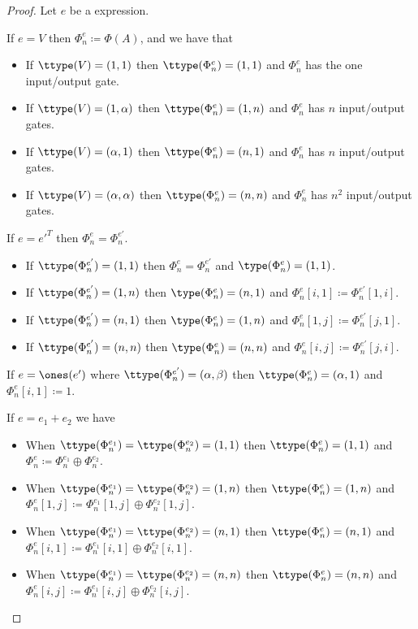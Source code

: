 \begin{proof}

Let $e$ be a \langfor expression. 

If $e=V$ then $\Phi_n^e\coloneqq \Phi(A)$, and we have that
\begin{itemize}
	\item If $\ttype(V)=(1,1)$ then $\ttype(\Phi^e_n)=(1,1)$ and $\Phi^e_n$ has the one input/output gate.
	\item If $\ttype(V)=(1,\alpha)$ then $\ttype(\Phi^e_n)=(1,n)$ and $\Phi^e_n$ has $n$ input/output gates.
  \item If $\ttype(V)=(\alpha,1)$ then $\ttype(\Phi^e_n)=(n,1)$ and $\Phi^e_n$ has $n$ input/output gates.
	\item If $\ttype(V)=(\alpha,\alpha)$ then $\ttype(\Phi^e_n)=(n,n)$ and $\Phi^e_n$ has $n^2$ input/output gates. 
\end{itemize}

If $e=e'^T$ then $\Phi^e_n=\Phi^{e'}_n$. 
\begin{itemize}
	\item If $\ttype(\Phi^{e'}_n)=(1, 1)$ then $\Phi^e_n=\Phi^{e'}_n$ and $\type(\Phi^e_n)=(1,1)$.
	\item If $\ttype(\Phi^{e'}_n)=(1, n)$ then $\type(\Phi^e_n)=(n,1)$ and $\Phi^e_n[i,1]\coloneqq \Phi^{e'}_n[1,i]$. 
  \item If $\ttype(\Phi^{e'}_n)=(n, 1)$ then $\type(\Phi^e_n)=(1,n)$ and $\Phi^e_n[1,j]\coloneqq \Phi^{e'}_n[j,1]$. 
  \item If $\ttype(\Phi^{e'}_n)=(n, n)$ then $\type(\Phi^e_n)=(n,n)$ and $\Phi^e_n[i,j]\coloneqq \Phi^{e'}_n[j,i]$. 
\end{itemize}

If $e={\ones}(e')$ where $\ttype(\Phi^{e'}_n)=(\alpha,\beta)$ then $\ttype(\Phi^{e}_n)=(\alpha,1)$ and $\Phi^e_n[i,1]\coloneqq 1$.

If $e=e_1 + e_2$ we have

\begin{itemize}
	\item When $\ttype(\Phi^{e_1}_n)=\ttype(\Phi^{e_2}_n)=(1, 1)$  then $\ttype(\Phi^{e}_n)=(1, 1)$ and $\Phi^e_n\coloneqq \Phi^{e_1}_n \oplus \Phi^{e_2}_n$.
  \item When $\ttype(\Phi^{e_1}_n)=\ttype(\Phi^{e_2}_n)=(1, n)$  then $\ttype(\Phi^{e}_n)=(1, n)$ and $\Phi^e_n[1,j]\coloneqq \Phi^{e_1}_n[1,j] \oplus \Phi^{e_2}_n[1,j]$.
  \item When $\ttype(\Phi^{e_1}_n)=\ttype(\Phi^{e_2}_n)=(n, 1)$  then $\ttype(\Phi^{e}_n)=(n, 1)$ and $\Phi^e_n[i,1]\coloneqq \Phi^{e_1}_n[i,1] \oplus \Phi^{e_2}_n[i,1]$.
  \item When $\ttype(\Phi^{e_1}_n)=\ttype(\Phi^{e_2}_n)=(n, n)$  then $\ttype(\Phi^{e}_n)=(n, n)$ and $\Phi^e_n[i,j]\coloneqq \Phi^{e_1}_n[i,j] \oplus \Phi^{e_2}_n[i,j]$.
\end{itemize}


\end{proof}
